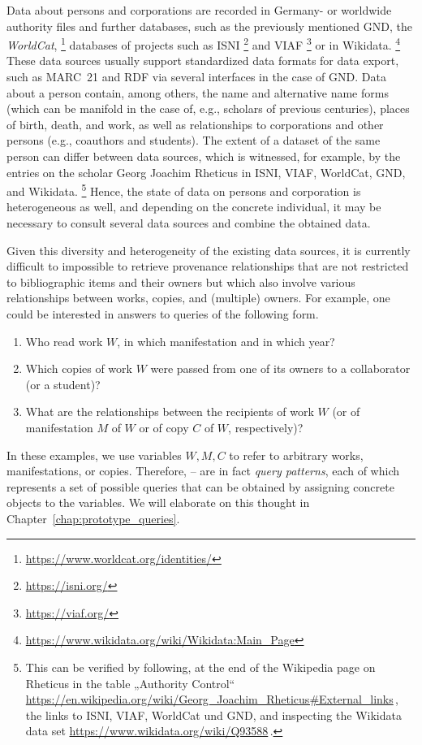 Data about persons and corporations are recorded
in Germany- or worldwide authority files and further databases,
such as the previously mentioned GND,
the \emph{WorldCat},%
\footnote{\url{https://www.worldcat.org/identities/}}
databases of projects such as ISNI%
\footnote{\url{https://isni.org/}}
and VIAF%
\footnote{\url{https://viaf.org/}}
or in Wikidata.%
\footnote{\url{https://www.wikidata.org/wiki/Wikidata:Main_Page}}
These data sources usually support standardized data formats for data export,
such as MARC~21 and RDF via several interfaces in the case of GND.
Data about a person contain, among others, the name and alternative name forms
(which can be manifold in the case of, e.g., scholars of previous centuries),
places of birth, death, and work,
as well as relationships to corporations and other persons
(e.g., coauthors and students).
The extent of a dataset of the same person can differ between data sources,
which is witnessed, for example, by the entries on the scholar
Georg Joachim Rheticus in ISNI, VIAF, WorldCat, GND, and Wikidata.%
\footnote{%
  This can be verified by following,
  at the end of the Wikipedia page on Rheticus 
  in the table „Authority Control“ \url{https://en.wikipedia.org/wiki/Georg_Joachim_Rheticus\#External_links}\,,
  the links to ISNI, VIAF, WorldCat und GND,
  and inspecting the Wikidata data set
  \url{https://www.wikidata.org/wiki/Q93588}\,.
}
Hence, the state of data on persons and corporation is heterogeneous as well,
and depending on the concrete individual, it may be necessary
to consult several data sources and combine the obtained data.

Given this diversity and heterogeneity of the existing data sources,
it is currently difficult to impossible to retrieve provenance relationships
that are not restricted to bibliographic items and their owners
but which also involve various relationships between works, copies, and (multiple) owners.
For example, one could be interested in answers to queries of the following form.
%
\begin{enumerate}
  \item[\exaquery{1}]
    Who read work $W$, in which manifestation and in which year?
  \item[\exaquery{2}]
    Which copies of work $W$ were passed from one of its owners to a collaborator (or a student)?
  \item[\exaquery{3}]
    What are the relationships between the recipients of work $W$
    (or of manifestation $M$ of $W$ or of copy $C$ of $W$, respectively)?
\end{enumerate}
%
In these examples, we use variables $W,M,C$ to refer to arbitrary works,
manifestations, or copies. Therefore, -- are in fact
\emph{query patterns}, each of which represents a set of possible queries
that can be obtained by assigning concrete objects to the variables.
We will elaborate on this thought in Chapter~\ref{chap:prototype_queries}.

